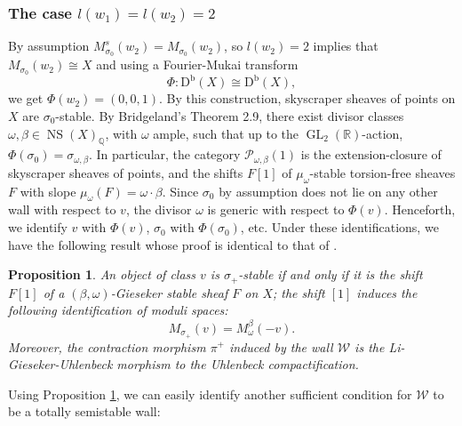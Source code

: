 \documentclass[leqno,11pt]{amsart}
\def\Q{\ensuremath{\mathbb{Q}}}
\def\R{\ensuremath{\mathbb{R}}}
\def\GL{\mathop{\mathrm{GL}}}
\def\NS{\mathop{\mathrm{NS}}\nolimits}
\def\Db{\mathrm{D}^{\mathrm{b}}}
\newtheorem{Prop}[Thm]{Proposition}
\theoremstyle{definition}
\def\Q{\ensuremath{\mathbb{Q}}}
\def\R{\ensuremath{\mathbb{R}}}
\def\PP{\ensuremath{\mathcal P}}
\def\WW{\ensuremath{\mathcal W}}
\begin{document}
\subsubsection{The case $l(w_1)=l(w_2)=2$} 
By assumption $M_{\sigma_0}^s(w_2)=M_{\sigma_0}(w_2)$, so $l(w_2)=2$ implies that $M_{\sigma_0}(w_2)\cong X$ and using a Fourier-Mukai transform $$\Phi:\Db(X)\cong\Db(X),$$ we get $\Phi(w_2)=(0,0,1)$.  By this construction, skyscraper sheaves of points on $X$ are  $\sigma_0$-stable. By Bridgeland’s Theorem 2.9, there exist divisor classes $\omega,\beta\in\NS(X)_{\Q}$, with $\omega$ ample, such that up to the $\GL_2(\R)$-action, $\Phi(\sigma_0)=\sigma_{\omega,\beta}$. In particular, the category $\PP_{\omega,\beta}(1)$ is the extension-closure of skyscraper sheaves of points, and the shifts $F[1]$ of $\mu_{\omega}$-stable torsion-free sheaves $F$ with slope $\mu_{\omega}(F) =\omega\cdot\beta$. Since $\sigma_0$ by assumption does not lie on any other wall with respect to $v$, the divisor $\omega$ is generic with respect to  $\Phi(v)$.  Henceforth, we identify $v$ with $\Phi(v)$, $\sigma_0$ with $\Phi(\sigma_0)$, etc.  Under these identifications, we have the following result whose proof is identical to that of \cite[Proposition 8.2]{BM14b}.
\begin{Prop}\label{Prop:Uhlenbeck morphism}
An object of class $v$ is $\sigma_+$-stable if and only if it is the shift $F[1]$ of a $(\beta,\omega)$-Gieseker stable sheaf $F$ on $X$; the shift $[1]$ induces the following identification of moduli spaces: $$M_{\sigma_+}(v) = M_{\omega}^{\beta}(-v).$$
Moreover, the contraction morphism $\pi^+$ induced by the wall $\WW$ is the Li-Gieseker-Uhlenbeck morphism to the Uhlenbeck compactification.
\end{Prop}

Using Proposition \ref{Prop:Uhlenbeck morphism}, we can easily identify another sufficient condition for $\WW$ to be a totally semistable wall:
\end{document}
